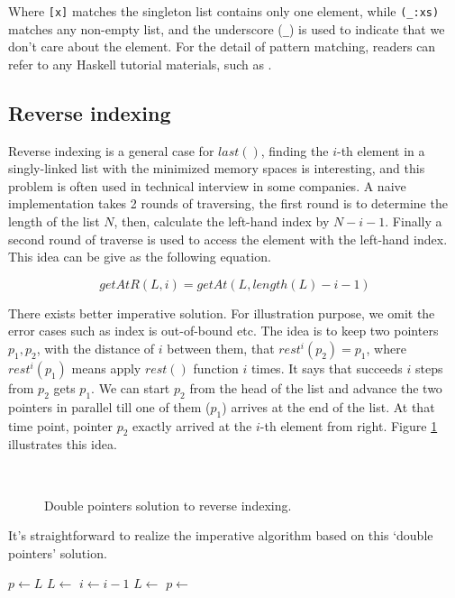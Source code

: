 \documentclass{article}
\begin{document}
Where \verb|[x]| matches the singleton list contains only one element, while \verb|(_:xs)| matches any non-empty list,
and the underscore (\verb|_|) is used to indicate that we don't care about the element. For the detail of pattern matching,
readers can refer to any Haskell tutorial materials, such as \cite{learn-haskell}.

\subsection{Reverse indexing}
Reverse indexing is a general case for $last()$, finding the $i$-th element in a singly-linked list
with the minimized memory spaces is interesting, and this problem is often used in technical interview
in some companies. A naive implementation takes 2 rounds of traversing, the first round is to determine
the length of the list $N$, then, calculate the left-hand index by $N - i - 1$. Finally a second round
of traverse is used to access the element with the left-hand index. This idea can be give as the 
following equation.

\[
  getAtR(L, i) = getAt(L, length(L) - i -1)
\]

There exists better imperative solution. For illustration purpose, we omit the error cases such
as index is out-of-bound etc. The idea is to keep two pointers $p_1, p_2$, with the distance
of $i$ between them, that $rest^i(p_2) = p_1$, where $rest^i(p_1)$ means apply $rest()$ function
$i$ times. It says that succeeds $i$ steps from $p_2$ gets $p_1$. We can start $p_2$ from the head
of the list and advance the two pointers in parallel till one of them ($p_1$) arrives at the end
of the list. At that time point, pointer $p_2$ exactly arrived at the $i$-th element from right.
Figure \ref{fig:list-rindex} illustrates this idea.

\begin{figure}[htbp]
    \centering
     \\
    \caption{Double pointers solution to reverse indexing.} \label{fig:list-rindex}
\end{figure}

It's straightforward to realize the imperative algorithm based on this `double pointers' solution.

\begin{algorithmic}
  \State $p \gets L$
    \State $L \gets $ 
    \State $i \gets i - 1$
  \EndWhile
    \State $L \gets$ 
    \State $p \gets$ 
  \EndWhile
  \State \Return {}
\EndFunction
\end{algorithmic}
\end{document}
